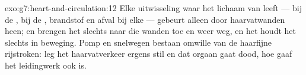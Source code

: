 \begin{solution}{exo:g7:heart-and-circulation:12}
Elke uitwisseling waar het lichaam van leeft ---  bij de
,  bij de , brandstof en afval bij
elke  --- gebeurt alleen door haarvatwanden heen;  en 
brengen het  slechts naar die wanden toe en weer weg, en het 
houdt het slechts in beweging. Pomp en snelwegen bestaan omwille van de
haarfijne rijstroken: leg het haarvatverkeer ergens stil en dat orgaan
gaat dood, hoe gaaf het leidingwerk ook is.
\end{solution}

